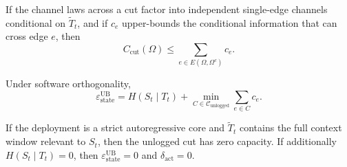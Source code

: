   \begin{lemma}
  \label{lem:ortho-decomp}
  If the channel laws across a cut factor into independent single-edge channels
  conditional on $\tilde T_t$, and if $c_e$ upper-bounds the conditional
  information that can cross edge $e$, then
  \[
    C_\text{cut}(\Omega)
    \leq
    \sum_{e\in E(\Omega,\Omega^c)} c_e .
  \]
  \end{lemma}

  \begin{corollary}
  \label{cor:additive-ub}
  Under software orthogonality,
  \[
    \varepsilon_\text{state}^\text{UB}
    =
    H(S_t\mid T_t)
    +
    \min_{C\in\mathcal{C}_\text{unlogged}}
    \sum_{e\in C} c_e .
  \]
  \end{corollary}

  \begin{corollary}
  \label{cor:auto-exact}
  If the deployment is a strict autoregressive core and $\tilde T_t$ contains
  the full context window relevant to $S_t$, then the unlogged cut has zero
  capacity. If additionally $H(S_t\mid T_t)=0$, then
  $\varepsilon_\text{state}^\text{UB}=0$ and $\delta_\text{act}=0$.
  \end{corollary}
